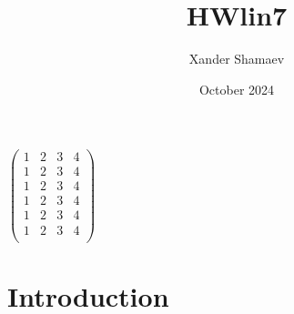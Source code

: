 \documentclass{article}
\title{HWlin7}
\author{Xander Shamaev}
\date{October 2024}
\begin{document}
\maketitle

$\begin{pmatrix}
    1 & 2 & 3 & 4 \\
    1 & 2 & 3 & 4 \\
    1 & 2 & 3 & 4 \\
    1 & 2 & 3 & 4 \\
    1 & 2 & 3 & 4 \\
    1 & 2 & 3 & 4 \\
\end{pmatrix}$
\section{Introduction}
\end{document}
